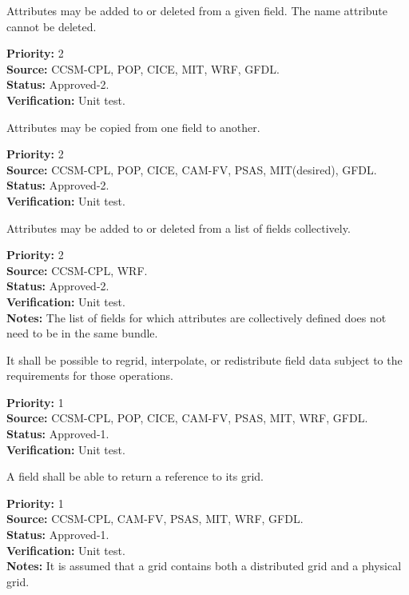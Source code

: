 Attributes may be added to or deleted from a given field.  The name
attribute cannot be deleted.
\begin{reqlist}
{\bf Priority:} 2 \\
{\bf Source:} CCSM-CPL, POP, CICE, MIT, WRF, GFDL. \\
{\bf Status:} Approved-2. \\
{\bf Verification:} Unit test. 
\end{reqlist}

Attributes may be copied from one field to another.
\begin{reqlist}
{\bf Priority:} 2 \\
{\bf Source:} CCSM-CPL, POP, CICE, CAM-FV, PSAS, MIT(desired), GFDL. \\
{\bf Status:} Approved-2. \\
{\bf Verification:} Unit test. 
\end{reqlist}

Attributes may be added to or deleted from a list of fields collectively.
\begin{reqlist}
{\bf Priority:} 2 \\
{\bf Source:} CCSM-CPL, WRF. \\
{\bf Status:} Approved-2. \\
{\bf Verification:} Unit test. \\
{\bf Notes:} The list of fields for which attributes are collectively defined
does not need to be in the same bundle.
\end{reqlist}


It shall be possible to regrid, interpolate, or redistribute field data
subject to the requirements for those operations.
\begin{reqlist}
{\bf Priority:} 1 \\
{\bf Source:} CCSM-CPL, POP, CICE, CAM-FV, PSAS, MIT, WRF, GFDL. \\
{\bf Status:} Approved-1. \\
{\bf Verification:} Unit test. 
\end{reqlist}

A field shall be able to return a reference to its grid.
\begin{reqlist}
{\bf Priority:} 1 \\
{\bf Source:} CCSM-CPL, CAM-FV, PSAS, MIT, WRF, GFDL. \\
{\bf Status:} Approved-1. \\
{\bf Verification:} Unit test. \\
{\bf Notes:} It is assumed that a grid contains both a distributed grid 
and a physical grid.
\end{reqlist}

